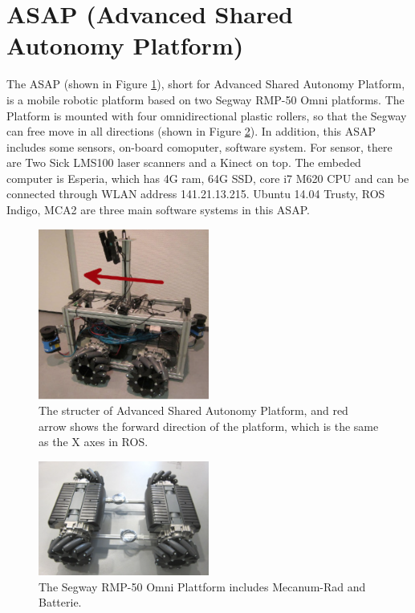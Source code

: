 \section{ASAP (Advanced Shared Autonomy Platform)}
The ASAP (shown in Figure \ref{ASAP}), short for Advanced Shared Autonomy Platform, is a mobile robotic platform based on two Segway RMP-50 Omni platforms. The Platform is mounted with four omnidirectional plastic rollers, so that the Segway can free move in all directions (shown in Figure \ref{Omni}). In addition, this ASAP includes some sensors, on-board comoputer, software system. For sensor, there are Two Sick LMS100 laser scanners and a Kinect on top. The embeded computer is Esperia, which has 4G ram, 64G SSD, core i7 M620 CPU and can be connected through WLAN address 141.21.13.215. Ubuntu 14.04 Trusty, ROS Indigo, MCA2 are three main software systems in this ASAP.

\begin{figure}[thpb]
      \centering
      \includegraphics[width=0.5\textwidth]{graphics/ASAP.png}
      \caption{The structer of Advanced Shared Autonomy Platform, and red arrow shows the forward direction of the platform, which is the same as the X axes in ROS.}
      \label{ASAP}
   \end{figure}

\begin{figure}[thpb]
      \centering
      \includegraphics[width=0.5\textwidth]{graphics/SegwayPlattform.png}
      \caption{The Segway RMP-50 Omni Plattform includes Mecanum-Rad and Batterie.}
      \label{Omni}
   \end{figure}

